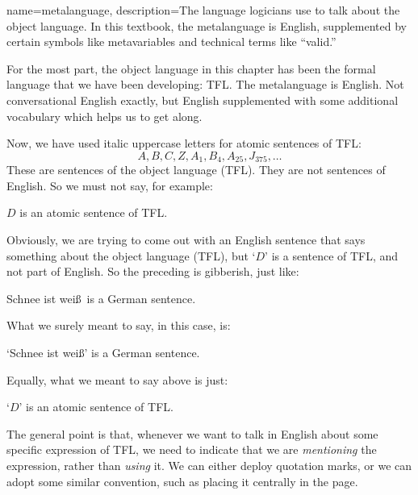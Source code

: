 {
name=metalanguage,
description={The language logicians use to talk about the object language. In this textbook, the metalanguage is English, supplemented by certain symbols like metavariables and technical terms like ``valid.''}
}

For the most part, the object language in this chapter has been the formal language that we have been developing: TFL. The metalanguage is English. Not conversational English exactly, but English supplemented with some additional vocabulary which helps us to get along.

Now, we have used italic uppercase letters for atomic sentences of TFL:
	$$A, B, C, Z, A_1, B_4, A_{25}, J_{375},\ldots$$
These are sentences of the object language (TFL). They are not sentences of English. So we must not say, for example:
	\begin{ebullet}
		\item $D$ is an atomic sentence of TFL.
	\end{ebullet}
Obviously, we are trying to come out with an English sentence that says something about the object language (TFL), but `$D$' is a sentence of TFL, and not part of English. So the preceding is gibberish, just like:
	\begin{ebullet}
		\item Schnee ist wei\ss\ is a German sentence.
	\end{ebullet}
What we surely meant to say, in this case, is:
	\begin{ebullet}
		\item `Schnee ist wei\ss' is a German sentence.
	\end{ebullet}
Equally, what we meant to say above is just:
	\begin{ebullet}
		\item `$D$' is an atomic sentence of TFL.
	\end{ebullet}
The general point is that, whenever we want to talk in English about some specific expression of TFL, we need to indicate that we are \emph{mentioning} the expression, rather than \emph{using} it. We can either deploy quotation marks, or we can adopt some similar convention, such as  placing it centrally in the page. 


